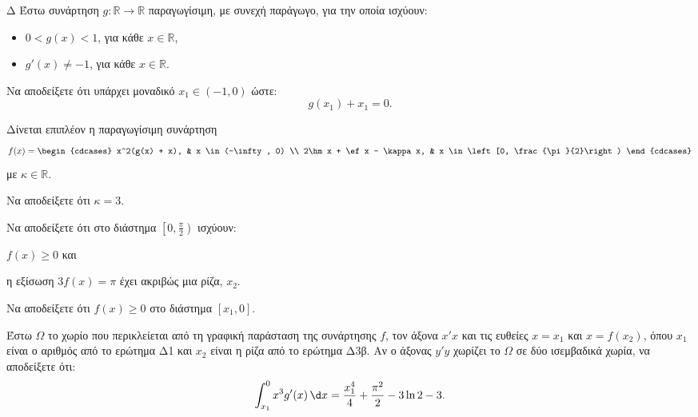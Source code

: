 \begin{thema}{Δ}
Έστω συνάρτηση $g: \mathbb{R} \to \mathbb{R}$ παραγωγίσιμη, με συνεχή παράγωγο, για την οποία ισχύουν:
\begin{itemize}
    \item $0 < g(x) < 1$, για κάθε $x \in \mathbb{R}$,
    \item $g'(x) \neq -1$, για κάθε $x \in \mathbb{R}$.
\end{itemize}
\begin{erwthma}
\item Να αποδείξετε ότι υπάρχει μοναδικό $x_1 \in (-1,0)$ ώστε:
\begin{equation*}
g(x_1) + x_1 = 0.
\end{equation*}

Δίνεται επιπλέον η παραγωγίσιμη συνάρτηση
\begin{equation*}
f(x) = \begin{cdcases} x^2(g(x) + x), & x \in (-\infty, 0) \\ 2\hm x + \ef x - \kappa x, & x \in \left[0, \frac{\pi}{2}\right) \end{cdcases}
\end{equation*}
με $\kappa \in \mathbb{R}$.
\item Να αποδείξετε ότι $\kappa = 3$.
\item Να αποδείξετε ότι στο διάστημα $\left[0, \frac{\pi}{2}\right)$ ισχύουν: 
\begin{alist}
\item $f(x) \geq 0$ και
\item η εξίσωση $3f(x) = \pi$ έχει ακριβώς μια ρίζα, $x_2$.

\end{alist}
\item 
\begin{alist}
\item Να αποδείξετε ότι $f(x) \geq 0$ στο διάστημα $\left[x_1, 0\right]$.
\item Έστω $\Omega$ το χωρίο που περικλείεται από τη γραφική παράσταση της συνάρτησης $f$, τον άξονα $x'x$ και τις ευθείες $x = x_1$ και $x = f(x_2)$, όπου $x_1$ είναι ο αριθμός από το ερώτημα Δ1 και $x_2$ είναι η ρίζα από το ερώτημα Δ3β. Αν ο άξονας $y'y$ χωρίζει το $\Omega$ σε δύο ισεμβαδικά χωρία, να αποδείξετε ότι:
\begin{equation*}
\int_{x_1}^{0} x^3 g'(x) \, \d x = \frac{x_1^4}{4} + \frac{\pi^2}{2} - 3\ln 2 - 3.
\end{equation*}
\end{alist}
\end{erwthma}
\end{thema}